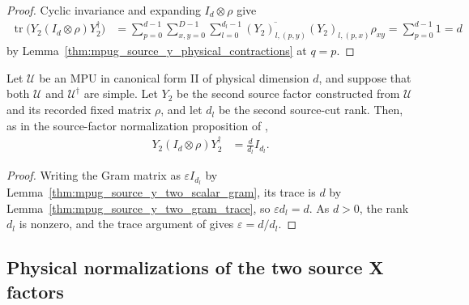 \begin{proof}\leanok
    Cyclic invariance and expanding $I_d\otimes\rho$ give
    \begin{align}
        \operatorname{tr}\bigl(Y_2(I_d\otimes\rho)Y_2^\dagger\bigr)
         & =\sum_{p=0}^{d-1}\sum_{x,y=0}^{D-1}\sum_{l=0}^{d_l-1}
        \overline{(Y_2)_{l,(p,y)}}(Y_2)_{l,(p,x)}\rho_{xy}
        =\sum_{p=0}^{d-1}1=d
    \end{align}
    by Lemma~\ref{thm:mpug_source_y_physical_contractions} at $q=p$.
\end{proof}

\begin{lemma}
    \label{thm:mpug_source_y_two_normalization}
    \leanok
    Let $\mathcal U$ be an MPU in canonical form II of physical dimension
    $d$, and suppose that both $\mathcal U$ and $\mathcal U^\dagger$ are
    simple. Let $Y_2$ be the second source factor constructed from
    $\mathcal U$ and its recorded fixed matrix $\rho$, and let $d_l$ be
    the second source-cut rank. Then, as in the source-factor normalization
    proposition of \cite[lines~1064--1119]{FrancoRubio2025MPUGauging},
    \begin{align}
        Y_2(I_d\otimes\rho)Y_2^\dagger & =\frac{d}{d_l}I_{d_l}.
    \end{align}
\end{lemma}

\begin{proof}\leanok
    Writing the Gram matrix as $\varepsilon I_{d_l}$ by
    Lemma~\ref{thm:mpug_source_y_two_scalar_gram}, its trace is $d$ by
    Lemma~\ref{thm:mpug_source_y_two_gram_trace}, so $\varepsilon d_l=d$.
    As $d>0$, the rank $d_l$ is nonzero, and the trace argument of
    \cite[line~1398]{FrancoRubio2025MPUGauging} gives $\varepsilon=d/d_l$.
\end{proof}

\subsection{Physical normalizations of the two source X factors}

